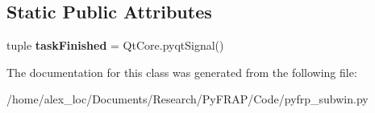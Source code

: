 \subsection*{Static Public Attributes}
\begin{DoxyCompactItemize}
\item 
\hypertarget{classpyfrp__subwin_1_1fitting__mol__thread_ad4e8634e61f98eaf8e40f63da9053155}{tuple {\bfseries task\+Finished} = Qt\+Core.\+pyqt\+Signal()}\label{classpyfrp__subwin_1_1fitting__mol__thread_ad4e8634e61f98eaf8e40f63da9053155}

\end{DoxyCompactItemize}


The documentation for this class was generated from the following file\+:\begin{DoxyCompactItemize}
\item 
/home/alex\+\_\+loc/\+Documents/\+Research/\+Py\+F\+R\+A\+P/\+Code/pyfrp\+\_\+subwin.\+py\end{DoxyCompactItemize}

